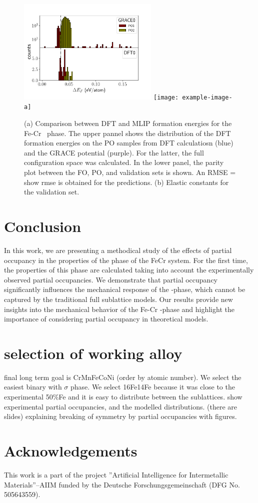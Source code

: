 \documentclass[superscriptaddress, 12pt]{revtex4-2}%
\newcommand{\MFnew}[1]{{\color{purple} #1}}
\begin{document}
\begin{figure}
  \includegraphics[width=0.6\textwidth]{Figure_GRACE_potential_prediction.pdf}
  \texttt{[image: example-image-a]}

  \caption{\protect\label{fig:MLIPPrediction}
    (a) Comparison between DFT and MLIP formation energies for the Fe-Cr \textsigma~phase. 
    The upper pannel shows the distribution of the DFT formation energies on the PO samples from DFT calculatiosn (blue) and the GRACE potential (purple). 
    For the latter, the full configuration space was calculated.
   In the lower panel, the parity plot between the FO, PO, and validation sets is shown. An RMSE = \MFnew{show rmse} is obtained for the predictions. 
   (b) Elastic constants for the validation set. 
	}

\end{figure}

\section{Conclusion}

In this work, we are presenting a methodical study of the effects of partial occupancy in the properties of the \textsigma phase of the FeCr system.
For the first time, the properties of this phase are calculated taking into account the experimentally observed partial occupancies.
We demonstrate that partial occupancy significantly influences the mechanical response of the \textsigma-phase, which cannot be captured by the traditional full sublattice models.
Our results provide new insights into the mechanical behavior of the Fe-Cr \textsigma-phase and highlight the importance of considering partial occupancy in theoretical models.

\section{selection of working alloy}
final long term goal is CrMnFeCoNi (order by atomic number).
We select the easiest binary with $\sigma$ phase.
We select 16Fe14Fe because it was close to the experimental 50\%Fe and it is easy to distribute between the sublattices.
show experimental partial occupancies, and the modelled distributions.
(there are slides)
explaining breaking of symmetry by partial occupancies with figures.

\section*{Acknowledgements} 

This work is a part of the project ”Artificial Intelligence for Intermetallic Materials”–AIIM funded by the Deutsche Forschungsgemeinschaft (DFG No. 505643559). 
 
\end{document}
